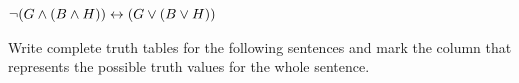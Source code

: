 \begin{compactlist}
\item $\neg(G \wedge (B \wedge H)) \leftrightarrow (G \vee (B \vee H))$
%


\end{compactlist}

\problempart
Write complete truth tables for the following sentences and mark the column that represents the possible truth values for the whole sentence.


